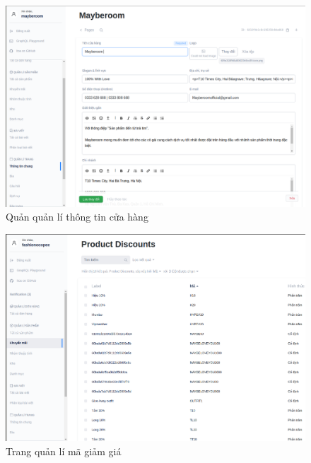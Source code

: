 \begin{figure}[!htbp]\fontsize{13px}{13px}\selectfont
	\begin{center}	
		\includegraphics[width=\textwidth]{./results/store}
		\caption{Quản quản lí thông tin cửa hàng}
	\end{center}
\end{figure}
\clearpage
\FloatBarrier
\begin{figure}[!htbp]\fontsize{13px}{13px}\selectfont
	\begin{center}	
		\includegraphics[width=\textwidth]{./results/discount}
		\caption{Trang quản lí mã giảm giá}
	\end{center}
\end{figure}
\clearpage
\FloatBarrier
